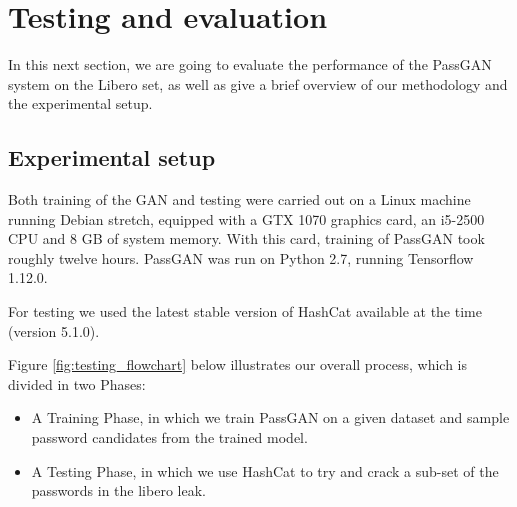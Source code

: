 \section{Testing and evaluation}\label{sec:testing_and_evaluation}
In this next section, we are going to evaluate the performance of the PassGAN system on the Libero set, as well as give a brief overview of our methodology and the experimental setup.

\subsection{Experimental setup}
Both training of the GAN and testing were carried out on a Linux machine running Debian stretch, equipped with a GTX 1070 graphics card, an i5-2500 CPU and 8 GB of system memory. 
With this card, training of PassGAN took roughly twelve hours.
PassGAN was run on Python 2.7, running Tensorflow 1.12.0.%

For testing we used the latest stable version of HashCat available at the time (version 5.1.0). %

Figure \ref{fig:testing_flowchart} below illustrates our overall process, which is divided in two Phases: 
\begin{itemize}
    \item A Training Phase, in which we train PassGAN on a given dataset and sample password candidates from the trained model.
    \item A Testing Phase, in which we use HashCat to try and crack a sub-set of the passwords in the libero leak.
\end{itemize}

